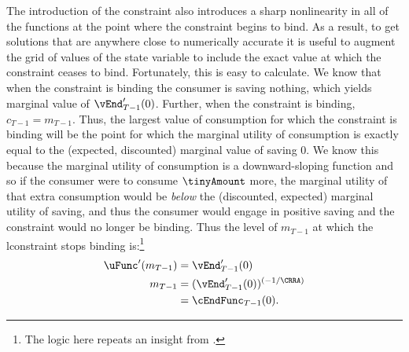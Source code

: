 \documentclass[titlepage, headings=optiontotocandhead]{\econtex}
\begin{document}

The introduction of the constraint also introduces a sharp
nonlinearity in all of the functions at the point where the constraint
begins to bind.  As a result, to get solutions that are anywhere close
to numerically accurate it is useful to augment the grid of values of
the state variable to include the exact value at which the constraint
ceases to bind.  Fortunately, this is easy to calculate.  We know that
when the constraint is binding the consumer is saving nothing, which
yields marginal value of $\vEnd_{T-1}^{\prime}(0)$. Further, when the
constraint is binding, ${c}_{T-1} = {m}_{T-1}$.  Thus, the largest
value of consumption for which the constraint is binding will be the
point for which the marginal utility of consumption is exactly equal
to the (expected, discounted) marginal value of saving 0.  We know
this because the marginal utility of consumption is a downward-sloping
function and so if the consumer were to consume $\tinyAmount$ more,
the marginal utility of that extra consumption would be \textit{below}
the (discounted, expected) marginal utility of saving, and thus the
consumer would engage in positive saving and the constraint would no
longer be binding.  Thus the level of ${m}_{T-1}$ at which the
lconstraint stops binding is:\footnote{The logic here repeats an insight from \cite{deatonLiqConstr}.}
\begin{equation}\begin{gathered}\begin{aligned}
      \uFunc^{\prime}({m}_{T-1})  & = \vEnd_{T-1}^{\prime}(0)  \nonumber \\
      {m}_{T-1}  & = (\vEnd_{T-1}^{\prime}(0))^{(-1/\CRRA)}  \nonumber
      \\        & = \cEndFunc_{T-1}(0). \label{eq:LCbindsTm1}
    \end{aligned}\end{gathered}\end{equation}
\end{document}
